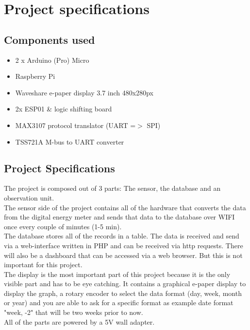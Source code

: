 \documentclass[a4paper,twoside, 12pt]{report}
\theoremstyle{break}
\begin{document}
\chapter{Project specifications}
\section{Components used}
\begin{itemize}
	\item 2 x Arduino (Pro) Micro
	\item Raspberry Pi
	\item Waveshare e-paper display 3.7 inch 480x280px
	\item 2x ESP01 \& logic shifting board
	\item MAX3107 protocol translator (UART =$>$ SPI)
	\item TSS721A M-bus to UART converter
	
\end{itemize}

\section{Project Specifications}
The project is composed out of 3 parts: The sensor, the database and an observation unit. \ \\
The sensor side of the project contains all of the hardware that converts the data from the digital energy meter and sends that data to the database over WIFI once every couple of minutes (1-5 min).
\ \\
The database stores all of the records in a table. The data is received and send via a web-interface written in PHP and can be received via http requests. There will also be a dashboard that can be accessed via a web browser. But this is not important for this project.
\ \\
The display is the most important part of this project because it is the only visible part and has to be eye catching. It contains a graphical e-paper display to display the graph, a rotary encoder to select the data format (day, week, month or year) and you are able to ask for a specific format as example date format "week, -2" that will be two weeks prior to now.
\ \\
All of the parts are powered by a 5V wall adapter.





\end{document}
